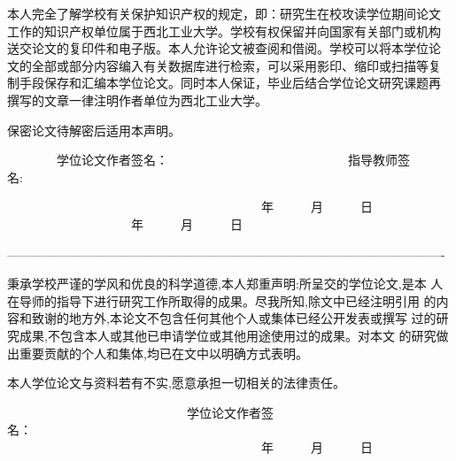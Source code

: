 
\newpage
\thispagestyle{empty}

\begin{center}
    {}
\end{center}

本人完全了解学校有关保护知识产权的规定，即：研究生在校攻读学位期间论文
工作的知识产权单位属于西北工业大学。学校有权保留并向国家有关部门或机构
送交论文的复印件和电子版。本人允许论文被查阅和借阅。学校可以将本学位论
文的全部或部分内容编入有关数据库进行检索，可以采用影印、缩印或扫描等复
制手段保存和汇编本学位论文。同时本人保证，毕业后结合学位论文研究课题再
撰写的文章一律注明作者单位为西北工业大学。

保密论文待解密后适用本声明。

\begin{flushleft}
~~~~~~~~学位论文作者签名：~~~~~~~~~~~~~~~~~~~~~~~~~~~~~指导教师签名:~~~~~~~~~~~~~~~~~~~~~~~~~~~~~~~~~~~~~~~~~

~~~~~~~~~~~~~~~~~~~~~~~~~~~~~~~~~~~~~~~~~年~~~~~~月~~~~~~日~~~~~~~~~~~~~~~~~~~~~~~~~~~~~~~~~年~~~~~~月~~~~~~日~~~~
\end{flushleft}

\vspace{1cm}
\begin{flushleft}
----------------------------------------------------------------------------------------------------------
\end{flushleft}
\vspace{1cm}

\begin{center}
    {}
\end{center}

秉承学校严谨的学风和优良的科学道德,本人郑重声明:所呈交的学位论文,是本
人在导师的指导下进行研究工作所取得的成果。尽我所知,除文中已经注明引用
的内容和致谢的地方外,本论文不包含任何其他个人或集体已经公开发表或撰写
过的研究成果,不包含本人或其他已申请学位或其他用途使用过的成果。对本文
的研究做出重要贡献的个人和集体,均已在文中以明确方式表明。

本人学位论文与资料若有不实,愿意承担一切相关的法律责任。

\begin{flushright}

~~~~~~~~~~~~~~~~~~~~~~~~~~~~~学位论文作者签名：~~~~~~~~~~~~~~~~~~~~~~~~~~~~~~\\          
~~~~~~~~~~~~~~~~~~~~~~~~~~~~~~~~~~~~~~~~~年~~~~~~月~~~~~~日~~~~~~~~~~
\end{flushright}

